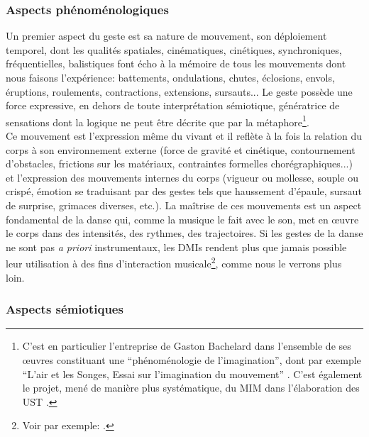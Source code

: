 \subsubsection{Aspects phénoménologiques}

\noindent Un premier aspect du geste est sa nature de mouvement, son déploiement temporel, dont les qualités spatiales, cinématiques, cinétiques, synchroniques, fréquentielles, balistiques font écho à la mémoire de tous les mouvements dont nous faisons l'expérience: battements, ondulations, chutes, éclosions, envols, éruptions, roulements, contractions, extensions, sursauts... Le geste possède une force expressive, en dehors de toute interprétation sémiotique, génératrice de sensations dont la logique ne peut être décrite que par la métaphore\footnote{C'est en particulier l'entreprise de Gaston Bachelard dans l'ensemble de ses œuvres constituant une ``phénoménologie de l'imagination'', dont par exemple ``L'air et les Songes, Essai sur l'imagination du mouvement'' \cite{bachelard_air_1943}. C'est également le projet, mené de manière plus systématique, du \gls{MIM} dans l'élaboration des \gls{UST} \cite{delalande_les_1996}.}.\\
\indent Ce mouvement est l'expression même du vivant et il reflète à la fois la relation du corps à son environnement externe (force de gravité et cinétique, contournement d'obstacles, frictions sur les matériaux, contraintes formelles chorégraphiques...) et l'expression des mouvements internes du corps (vigueur ou mollesse, souple ou crispé, émotion se traduisant par des gestes tels que haussement d'épaule, sursaut de surprise, grimaces diverses, etc.). La maîtrise de ces mouvements est un aspect fondamental de la danse qui, comme la musique le fait avec le son, met en œuvre le corps dans des intensités, des rythmes, des trajectoires. Si les gestes de la danse ne sont pas \textit{a priori} instrumentaux, les \glspl{DMI} rendent plus que jamais possible leur utilisation à des fins d'interaction musicale\footnote{Voir par exemple: \cite{bevilacqua_gesture_2011, alaoui_movement_2012, silang_maranan_designing_2014, hsueh_understanding_2019}.}, comme nous le verrons plus loin.

\subsubsection{Aspects sémiotiques}

